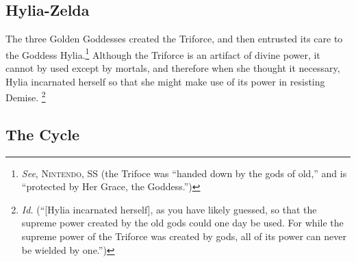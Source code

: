 \documentclass[../FGP.tex]{subfiles}
\begin{document}
\subsection{Hylia-Zelda}
The three Golden Goddesses created the Triforce, and then entrusted its care to the Goddess Hylia.\footnote{\textit{See}, \textsc{Nintendo, SS} (the Trifoce was ``handed down by the gods of old,'' and is ``protected by Her Grace, the Goddess.'')} Although the Triforce is an artifact of divine power, it cannot by used except by mortals, and therefore when she thought it necessary, Hylia incarnated herself so that she might make use of its power in resisting Demise.%
  \footnote{\textit{Id.} (``[Hylia incarnated herself], as you have likely guessed, so that the supreme power created by the old gods could one day be used. For while the supreme power of the Triforce was created by gods, all of its power can never be wielded by one.'')}
\subsection{The Cycle}
\end{document}
